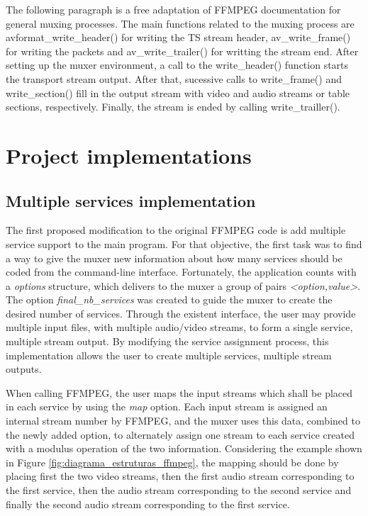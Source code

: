 \documentclass[
	12pt,				%
	openright,			%
	twoside,			%
	a4paper,			%
	brazil,
	french,				%
	english
	]{abntex2}
\begin{document}
The following paragraph is a free adaptation of FFMPEG documentation for general muxing processes. The main functions related to the muxing process are avformat\_write\_header() for writing the TS stream header, av\_write\_frame() for writing the packets and av\_write\_trailer() for writting the stream end. After setting up the muxer environment, a call to the write\_header() function starts the transport stream output. After that, sucessive calls to write\_frame() and write\_section() fill in the output stream with video and audio streams or table sections, respectively. Finally, the stream is ended by calling write\_trailler().



\chapter{Project implementations}

\section{Multiple services implementation}

The first proposed modification to the original FFMPEG code is add multiple service support to the main program. For that objective, the first task was to find a way to give the muxer new information about how many services should be coded from the command-line interface. Fortunately, the application counts with a \textit{options} structure, which delivers to the muxer a group of pairs \textit{<option,value>}. The option \textit{final\_nb\_services} was created to guide the muxer to create the desired number of services. Through the existent interface, the user may provide multiple input files, with multiple audio/video streams, to form a single service, multiple stream output. By modifying the service assignment process, this implementation allows the user to create multiple services, multiple stream outputs.

When calling FFMPEG, the user maps the input streams which shall be placed in each service by using the \textit{\-map} option. Each input stream is assigned an internal stream number by FFMPEG, and the muxer uses this data, combined to the newly added option, to alternately assign one stream to each service created with a modulus operation of the two information. Considering the example shown in Figure \ref{fig:diagrama_estruturas_ffmpeg}, the mapping should be done by placing first the two video streams, then the first audio stream corresponding to the first service, then the audio stream corresponding to the second service and finally the second audio stream corresponding to the first service.
\end{document}
